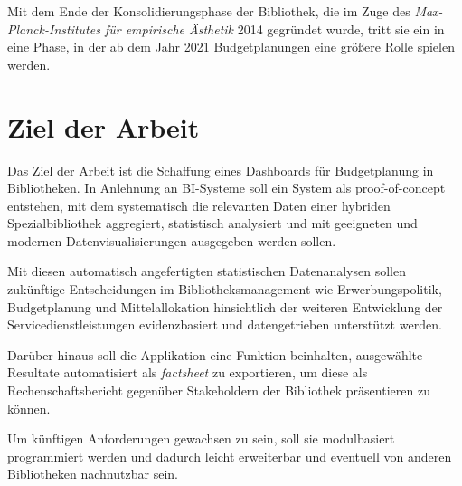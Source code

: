 
Mit dem Ende der Konsolidierungsphase der
Bibliothek, die im Zuge des \textit{Max-Planck-Institutes für empirische
Ästhetik} 2014 gegründet wurde, tritt sie ein in eine Phase, in der ab dem Jahr
2021 Budgetplanungen eine größere Rolle spielen werden.


\section{Ziel der Arbeit}
Das Ziel der Arbeit ist die Schaffung eines Dashboards für Budgetplanung in Bibliotheken. 
In Anlehnung an \acrfull{BI}-Systeme soll ein System als proof-of-concept entstehen,
mit dem systematisch die relevanten Daten einer hybriden Spezialbibliothek aggregiert, statistisch
analysiert und mit geeigneten und modernen Datenvisualisierungen ausgegeben werden sollen.

Mit diesen automatisch angefertigten statistischen Datenanalysen sollen zukünftige
Entscheidungen im Bibliotheksmanagement wie Erwerbungspolitik, Budgetplanung und
Mittelallokation hinsichtlich der weiteren Entwicklung der
Servicedienstleistungen evidenzbasiert und datengetrieben unterstützt werden.

Darüber hinaus soll die Applikation  eine Funktion beinhalten, ausgewählte
Resultate automatisiert als \textit{factsheet} zu exportieren, um diese
als Rechenschaftsbericht gegenüber Stakeholdern der Bibliothek präsentieren zu können.

Um künftigen Anforderungen gewachsen zu sein, soll sie
modulbasiert programmiert werden und dadurch leicht erweiterbar und eventuell von
anderen Bibliotheken nachnutzbar sein.


